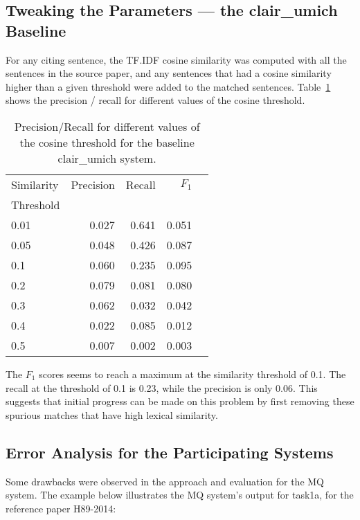 \documentclass[11pt]{article}
\begin{document}
\subsection{Tweaking the Parameters --- the clair\_umich Baseline}
For any citing sentence, the TF.IDF cosine similarity was computed with all 
the sentences in the source paper, and any sentences that had a cosine 
similarity higher than a given threshold were added to the matched sentences. 
Table~\ref{tab:clairumichbaseline} shows the precision / recall for different 
values of the cosine threshold.
\begin{table}[h]
  \centering
  \begin{tabular}{|l|r|r|r|r|}
  	\hline
	Similarity & Precision & Recall & $F_1$ \\
	Threshold & & & \\
	\hline
	0.01 & 0.027 & 0.641 & 0.051\\
	0.05 & 0.048 & 0.426 & 0.087\\
	0.1 & 0.060 & 0.235 & 0.095\\
	0.2 & 0.079 & 0.081 & 0.080\\
	0.3 & 0.062 & 0.032 & 0.042\\
	0.4 & 0.022 & 0.085 & 0.012\\
	0.5 & 0.007 &  0.002 & 0.003\\
	\hline
  \end{tabular}
  \caption{Precision/Recall for different values of the cosine threshold 
  			for the baseline clair\_umich system.}
  \label{tab:clairumichbaseline}
\end{table}

The $F_1$ scores seems to reach a maximum at the similarity threshold of 0.1. 
The recall at the threshold of 0.1 is 0.23, while the precision is only 
0.06. This suggests that initial progress can be made on this problem by first 
removing these spurious matches that have high lexical similarity.
\subsection{Error Analysis for the Participating Systems}

Some drawbacks were observed in the approach and evaluation for the MQ system. 
The example below illustrates the MQ system's output for task1a, for the 
reference paper H89-2014:

\noindent{}
\end{document}
